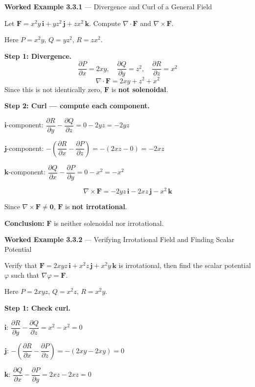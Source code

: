 \documentclass[12pt,a4paper]{article}
\begin{document}
\vspace{8pt}
\textbf{Worked Example 3.3.1} --- Divergence and Curl of a General Field

Let $\mathbf{F} = x^2 y\,\mathbf{i} + yz^2\,\mathbf{j} + zx^2\,\mathbf{k}$. Compute $\nabla \cdot \mathbf{F}$ and $\nabla \times \mathbf{F}$.

Here $P = x^2 y$, $Q = yz^2$, $R = zx^2$.

\textbf{Step 1: Divergence.}
\[
  \frac{\partial P}{\partial x} = 2xy, \quad \frac{\partial Q}{\partial y} = z^2, \quad \frac{\partial R}{\partial z} = x^2
\]
\[
  \nabla \cdot \mathbf{F} = 2xy + z^2 + x^2
\]
Since this is not identically zero, $\mathbf{F}$ is \textbf{not solenoidal}.

\textbf{Step 2: Curl --- compute each component.}

$\mathbf{i}$-component: $\dfrac{\partial R}{\partial y} - \dfrac{\partial Q}{\partial z} = 0 - 2yz = -2yz$

$\mathbf{j}$-component: $-\!\left(\dfrac{\partial R}{\partial x} - \dfrac{\partial P}{\partial z}\right) = -(2xz - 0) = -2xz$

$\mathbf{k}$-component: $\dfrac{\partial Q}{\partial x} - \dfrac{\partial P}{\partial y} = 0 - x^2 = -x^2$

\[
  \nabla \times \mathbf{F} = -2yz\,\mathbf{i} - 2xz\,\mathbf{j} - x^2\,\mathbf{k}
\]

Since $\nabla \times \mathbf{F} \neq \mathbf{0}$, $\mathbf{F}$ is \textbf{not irrotational}.

\textbf{Conclusion:} $\mathbf{F}$ is neither solenoidal nor irrotational.

\vspace{8pt}
\textbf{Worked Example 3.3.2} --- Verifying Irrotational Field and Finding Scalar Potential

Verify that $\mathbf{F} = 2xyz\,\mathbf{i} + x^2 z\,\mathbf{j} + x^2 y\,\mathbf{k}$ is irrotational, then find the scalar potential $\varphi$ such that $\nabla \varphi = \mathbf{F}$.

Here $P = 2xyz$, $Q = x^2 z$, $R = x^2 y$.

\textbf{Step 1: Check curl.}

$\mathbf{i}$: $\dfrac{\partial R}{\partial y} - \dfrac{\partial Q}{\partial z} = x^2 - x^2 = 0$

$\mathbf{j}$: $-\!\left(\dfrac{\partial R}{\partial x} - \dfrac{\partial P}{\partial z}\right) = -(2xy - 2xy) = 0$

$\mathbf{k}$: $\dfrac{\partial Q}{\partial x} - \dfrac{\partial P}{\partial y} = 2xz - 2xz = 0$
\end{document}

